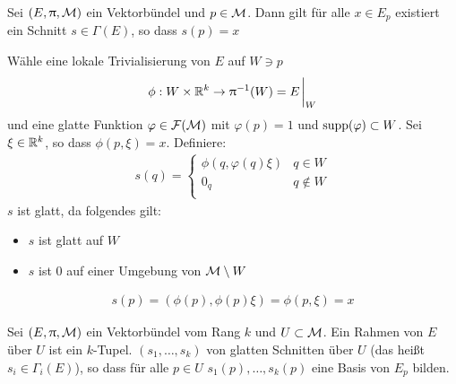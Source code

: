 \begin{lem}
Sei $(E, \uppi, \mathcal{M})$ ein Vektorbündel und $p \in \mathcal{M}$.
Dann gilt für alle $x \in E_p$ existiert ein Schnitt $s \in \Gamma (E)$, so dass $s(p)=x$
\end{lem}
\begin{bew}
Wähle eine lokale Trivialisierung von $E$ auf $W \ni p$
\begin{align}
\phi: W \times \R^k \to \pi^{-1}(W) = E\eval_W
\end{align}
und eine glatte Funktion $\varphi \in \mathcal{F}(\mathcal{M})$ mit $\varphi(p)=1$ und $\operatorname{supp}(\varphi) \subset W$.
Sei $\xi \in \mathbb{R}^k$, so dass $\phi (p, \xi)=x$.
Definiere:
\begin{align}
s(q) = \left\{
\begin{array}{ll}
\phi(q, \varphi(q)\xi) & q\in W \\
0_q & q \not\in W \\
\end{array}
\right.
\end{align}
$s$ ist glatt, da folgendes gilt:
\begin{itemize}
\item $s$ ist glatt auf $W$
\item $s$ ist $0$ auf einer Umgebung von $\mathcal{M} \setminus W$
\end{itemize}
\begin{align}
s(p) = ( \phi(p), \phi(p) \xi ) = \phi (p , \xi) = x
\end{align}
\end{bew}

\begin{defs}
Sei $(E, \uppi, \mathcal{M})$ ein Vektorbündel vom Rang $k$ und $U \subset \mathcal{M}$.
Ein Rahmen von $E$ über $U$ ist ein $k$-Tupel.
$(s_1, \dots, s_k)$ von glatten Schnitten über $U$ (das heißt $s_i \in \Gamma_i (E)$), so dass für alle $p \in U$
$s_1 (p), \dots, s_k (p)$ eine Basis von $E_p$ bilden.
\end{defs}